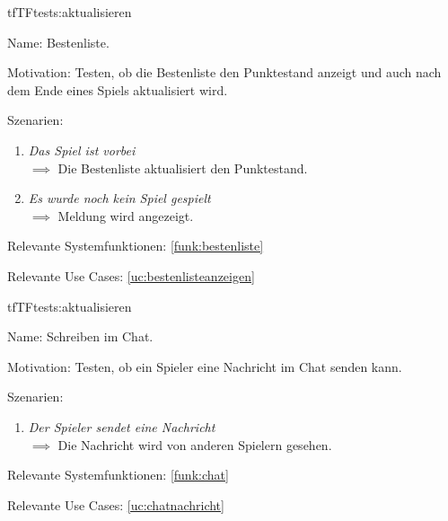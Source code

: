 \begin{description}[leftmargin=5em, style=sameline]
\begin{lhp}{tf}{TF}{tests:aktualisieren}
	\item [Name:]Bestenliste.
	\item [Motivation:] Testen, ob die Bestenliste den Punktestand anzeigt und auch nach dem Ende eines Spiels aktualisiert wird.
	\item [Szenarien:] \hfill
		\begin{enumerate}
        \item \textit{Das Spiel ist vorbei} \\ $\implies$ Die Bestenliste aktualisiert den Punktestand.
            \item \textit{Es wurde noch kein Spiel gespielt} \\ $\implies$  Meldung wird angezeigt.
		\end{enumerate}
	\item [Relevante Systemfunktionen:] \ref{funk:bestenliste}
	\item [Relevante Use Cases:] \ref{uc:bestenlisteanzeigen}
\end{lhp}
\begin{lhp}{tf}{TF}{tests:aktualisieren}
	\item [Name:]Schreiben im Chat.
	\item [Motivation:] Testen, ob ein Spieler eine Nachricht im Chat senden kann.  
	\item [Szenarien:] \hfill
		\begin{enumerate}
        \item \textit{Der Spieler sendet eine Nachricht} \\ $\implies$ Die Nachricht wird von anderen Spielern gesehen.
		\end{enumerate}
	\item [Relevante Systemfunktionen:] \ref{funk:chat}
	\item [Relevante Use Cases:] \ref{uc:chatnachricht}
\end{lhp}
\end{description}
